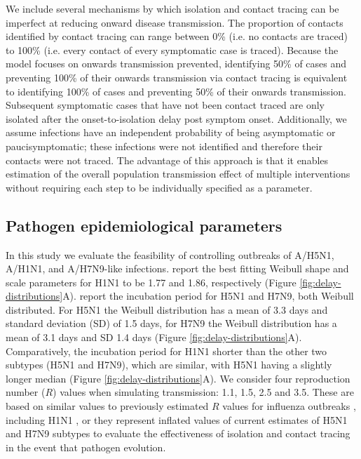 \documentclass{article}
\begin{document}
We include several mechanisms by which isolation and contact tracing can be imperfect at reducing onward disease transmission. The proportion of contacts identified by contact tracing can range between 0\% (i.e. no contacts are traced) to 100\% (i.e. every contact of every symptomatic case is traced). Because the model focuses on onwards transmission prevented, identifying 50\% of cases and preventing 100\% of their onwards transmission via contact tracing is equivalent to identifying 100\% of cases and preventing 50\% of their onwards transmission. Subsequent symptomatic cases that have not been contact traced are only isolated after the onset-to-isolation delay post symptom onset. Additionally, we assume infections have an independent probability of being asymptomatic or paucisymptomatic; these infections were not identified and therefore their contacts were not traced. The advantage of this approach is that it enables estimation of the overall population transmission effect of multiple interventions without requiring each step to be individually specified as a parameter.


\subsection*{Pathogen epidemiological parameters} \label{epiparameters}

In this study we evaluate the feasibility of controlling outbreaks of A/H5N1, A/H1N1, and A/H7N9-like infections.\cite{nishiuraEstimationIncubationPeriod2011} report the best fitting Weibull shape and scale parameters for H1N1 to be 1.77 and 1.86, respectively (Figure \ref{fig:delay-distributions}A). \cite{cowlingComparativeEpidemiologyHuman2013} report the incubation period for H5N1 and H7N9, both Weibull distributed. For H5N1 the Weibull distribution has a mean of 3.3 days and standard deviation (SD) of 1.5 days, for H7N9 the Weibull distribution has a mean of 3.1 days and SD 1.4 days \citep{cowlingComparativeEpidemiologyHuman2013} (Figure \ref{fig:delay-distributions}A). Comparatively, the incubation period for H1N1 shorter than the other two subtypes (H5N1 and H7N9), which are similar, with H5N1 having a slightly longer median (Figure \ref{fig:delay-distributions}A).  We consider four reproduction number ($R$) values when simulating transmission: 1.1, 1.5, 2.5 and 3.5. These are based on similar values to previously estimated $R$ values for influenza outbreaks \citep{fergusonStrategiesMitigatingInfluenza2006}, including H1N1 \citep{fraserPandemicPotentialStrain2009, lesslerOutbreak2009Pandemic2009}, or they represent inflated values of current estimates of H5N1 and H7N9 subtypes to evaluate the effectiveness of isolation and contact tracing in the event that pathogen evolution.
\end{document}
